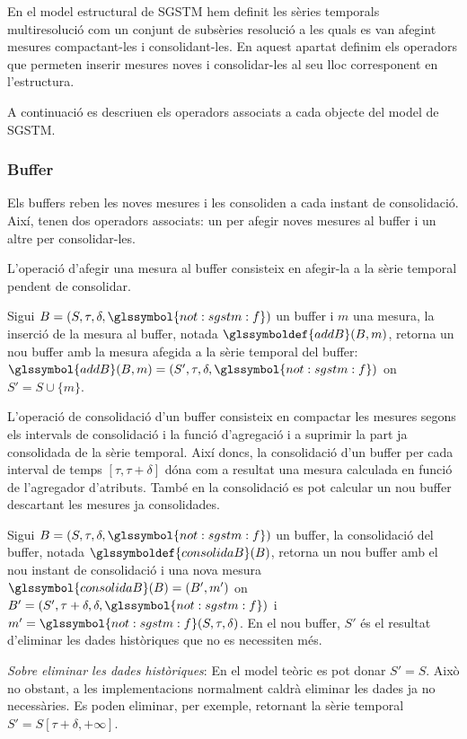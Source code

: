 En el model estructural de \gls{SGSTM} hem definit les sèries temporals
multiresolució com un conjunt de subsèries resolució a les quals es
van afegint mesures compactant-les i consolidant-les. En aquest
apartat definim els operadors que permeten inserir mesures noves i
consolidar-les al seu lloc corresponent en l'estructura.

A continuació es descriuen els operadors associats a cada objecte del
model de \gls{SGSTM}.


\subsubsection{Buffer}

Els buffers reben les noves mesures i les consoliden a cada instant de
consolidació. Així, tenen dos operadors associats: un per afegir noves
mesures al buffer i un altre per consolidar-les.


L'operació d'afegir una mesura al buffer consisteix en afegir-la a la
sèrie temporal pendent de consolidar.
\begin{definition}
  \label{def:sgstm:addB}
  Sigui $B=(S,\tau,\delta,\glssymbol{not:sgstm:f})$ un buffer i $m$
  una mesura, la inserció de la mesura al buffer, notada
  $\glssymboldef{addB}(B,m)$, retorna un nou buffer amb la mesura
  afegida a la sèrie temporal del buffer: $\glssymbol{addB}(B,m) =
  (S',\tau,\delta,\glssymbol{not:sgstm:f})$ on $S'=S\cup \{m\}$.
\end{definition}


L'operació de consolidació d'un buffer consisteix en compactar les
mesures segons els intervals de consolidació i la funció d'agregació i
a suprimir la part ja consolidada de la sèrie temporal.  Així doncs,
la consolidació d'un buffer per cada interval de temps
$[\tau,\tau+\delta]$ dóna com a resultat una mesura calculada en
funció de l'agregador d'atributs. També en la consolidació es pot
calcular un nou buffer descartant les mesures ja consolidades.
\begin{definition}\label{def:model:consolidacio-buffer}
  Sigui $B=(S,\tau,\delta,\glssymbol{not:sgstm:f})$ un buffer, la
  consolidació del buffer, notada $\glssymboldef{consolidaB}(B)$,
  retorna un nou buffer amb el nou instant de consolidació i una nova
  mesura $\glssymbol{consolidaB}(B) = (B',m')$ on
  $B'=(S',\tau+\delta,\delta,\glssymbol{not:sgstm:f})$ i
  $m'=\glssymbol{not:sgstm:f}(S,\tau,\delta)$.  En el nou buffer, $S'$
  és el resultat d'eliminar les dades històriques que no es necessiten
  més.

  \emph{Sobre eliminar les dades històriques}: En el model teòric es
  pot donar $S'=S$. Això no obstant, a les implementacions normalment
  caldrà eliminar les dades ja no necessàries.  Es poden eliminar, per
  exemple, retornant la sèrie temporal $S'= S[\tau+\delta,+\infty]$.
\end{definition}


